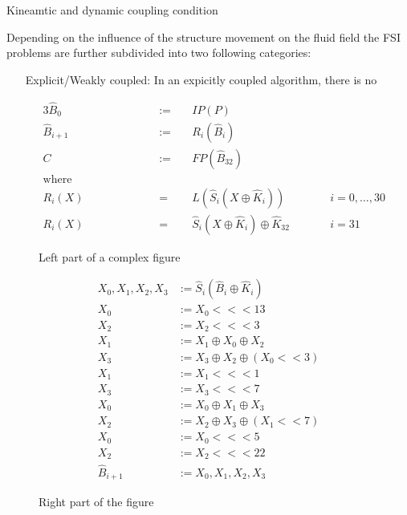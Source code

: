 {Kineamtic and dynamic coupling condition}

Depending on the influence of the structure movement on the fluid field the FSI problems are further subdivided into two following categories:

\begin{itemize}
\item[Explicit/Weakly coupled:]	In an expicitly coupled algorithm, there is no 
\end{itemize}





\begin{figure}
\centering
\footnotesize
\begin{minipage}[b]{0.50\textwidth}
\centering
\begin{alignat*}{3}
	\hat B_0     & := &\;& IP(P)           \\
	\hat B_{i+1} & := &&   R_i(\hat B_i)   \\
	C            & := &&   FP(\hat B_{32}) \\
	\text{where~~~~~~~~~~~~~~~~~~~~~}      \\
	R_i(X)       & =  &&   L(\hat S_i(X \oplus \hat K_i))
						&\qquad& i = 0, \ldots, 30 \\
	R_i(X)       & =  &&   \hat S_i(X \oplus \hat K_i) \oplus \hat K_{32}
						&& i = 31
\end{alignat*}
\caption{Left part of a complex figure}
\label{fig:serpentcode}
\end{minipage}
\hspace{0.25cm}
\vline
\hspace{0.25cm}
\begin{minipage}[b]{0.40\textwidth}
\centering
\begin{align*}
	X_0,X_1,X_2,X_3 & := \hat S_i(\hat B_i \oplus \hat K_i) \\
	X_0             & := X_0 <<< 13 \\
	X_2             & := X_2 <<< 3 \\
	X_1             & := X_1 \oplus X_0 \oplus X_2 \\
	X_3             & := X_3 \oplus X_2 \oplus (X_0 << 3) \\
	X_1             & := X_1 <<< 1 \\
	X_3             & := X_3 <<< 7 \\
	X_0             & := X_0 \oplus X_1 \oplus X_3 \\
	X_2             & := X_2 \oplus X_3 \oplus (X_1 << 7) \\
	X_0             & := X_0 <<< 5 \\
	X_2             & := X_2 <<< 22 \\
	\hat B_{i+1}    & := X_0,X_1,X_2,X_3
\end{align*}
\caption{Right part of the figure}
\label{fig:serpentlin}
\end{minipage}
\end{figure}

